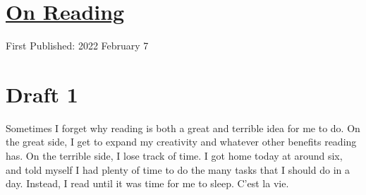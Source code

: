 \documentclass[12pt]{article}[titlepage]
\newcommand{\1}{\={a}}
\newcommand{\2}{\={e}}
\newcommand{\3}{\={\i}}
\newcommand{\4}{\=o}
\newcommand{\5}{\=u}
\newcommand{\6}{\={A}}
\renewcommand{\,}{\textsuperscript{,}}
\begin{document}
\doublespacing
\section{\href{reading.html}{On Reading}}
First Published: 2022 February 7

\section{Draft 1}
Sometimes I forget why reading is both a great and terrible idea for me to do.
On the great side, I get to expand my creativity and whatever other benefits reading has.
On the terrible side, I lose track of time.
I got home today at around six, and told myself I had plenty of time to do the many tasks that I should do in a day.
Instead, I read until it was time for me to sleep.
C'est la vie.
\end{document}
